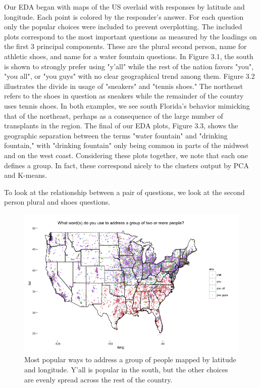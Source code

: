 \documentclass[english]{article}\usepackage{graphicx, color}
\numberwithin{equation}{section}
\numberwithin{figure}{section}
\begin{document}
Our EDA began with maps of the US overlaid with responses by latitude and longitude. Each point is colored by the responder's answer. For each question only the popular choices were included to prevent overplotting. The included plots correspond to the most important questions as measured by the loadings on the first 3 principal components. These are the plural second person, name for athletic shoes, and name for a water fountain questions. In Figure 3.1, the south is shown to strongly prefer using "y'all" while the rest of the nation favors "you", "you all", or "you guys" with no clear geographical trend among them. Figure 3.2 illustrates the divide in usage of "sneakers" and "tennis shoes." The northeast refers to the shoes in question as sneakers while the remainder of the country uses tennis shoes. In both examples, we see south Florida's behavior mimicking that of the northeast, perhaps as a consequence of the large number of transplants in the region. The final of our EDA plots, Figure 3.3, shows the geographic separation between the terms "water fountain" and "drinking fountain," with "drinking fountain" only being common in parts of the midwest and on the west coast. Considering these plots together, we note that each one defines a group. In fact, these correspond nicely to the clusters output by PCA and K-means. 

To look at the relationship between a pair of questions, we look at the second person plural and shoes questions. 
\begin{figure}
\begin{center}
\includegraphics[scale = .5]{Rplot1.png}
\end{center}
\caption{Most popular ways to address a group of people mapped by latitude and longitude. Y'all is popular in the south, but the other choices are evenly spread across the rest of the country.}
\end{figure}
\end{document}
